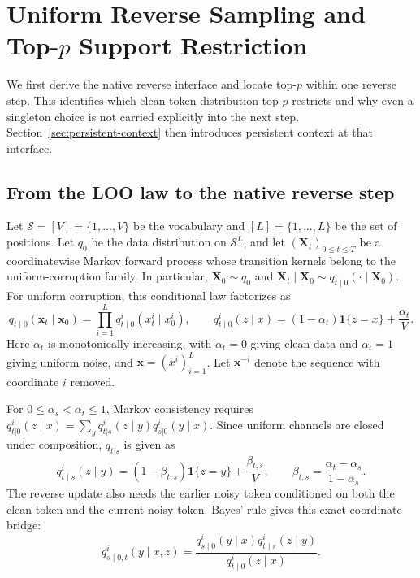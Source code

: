 \documentclass{article}
\newcommand{\1}{\mathbf 1}
\theoremstyle{definition}
\begin{document}
\section{Uniform Reverse Sampling and
\texorpdfstring{Top-$p$ Support Restriction}{Top-p Support Restriction}}
\label{sec:uniform-reverse}

We first derive the native reverse interface and locate top-$p$ within one
reverse step. This identifies which clean-token distribution top-$p$ restricts
and why even a singleton choice is not carried explicitly into the next
step. Section~\ref{sec:persistent-context} then introduces persistent context
at that interface.

\subsection{From the LOO law to the native reverse step}

Let $\mathcal S=[V]=\{1,\ldots,V\}$ be the vocabulary and
$[L]=\{1,\ldots,L\}$ be the set of positions. Let $q_0$ be the data distribution on
$\mathcal S^L$, and let $(\bm X_t)_{0\le t\le T}$ be a coordinatewise Markov forward process whose transition kernels belong to the uniform-corruption family. In particular,
$\bm X_0\sim q_0$ and
$\bm X_t\mid\bm X_0\sim q_{t\mid0}(\cdot\mid\bm X_0)$. For uniform
corruption, this conditional law factorizes as
\begin{equation}
 q_{t\mid0}(\bm x_t\mid\bm x_0)
 =\prod_{i=1}^Lq_{t\mid0}^i(x_t^i\mid x_0^i),
 \qquad
 q_{t\mid0}^i(z\mid x)
 =(1-\alpha_t)\1\{z=x\}+\frac{\alpha_t}{V}.
 \label{eq:uniform-forward-main}
\end{equation}
Here $\alpha_t$ is monotonically increasing,
with $\alpha_t=0$ giving clean data and $\alpha_t=1$ giving uniform noise,
and $\bm x=(x^i)_{i=1}^L$. Let $\bm x^{-i}$ denote the sequence with
coordinate $i$ removed.

For $0\le\alpha_s<\alpha_t\le1$, Markov consistency requires
$q_{t|0}^i(z\mid x) = \sum_y q_{t|s}^i(z\mid y)q_{s|0}^i(y\mid x)$.
Since uniform channels are closed under composition, $q_{t|s}$ is given as
\begin{equation}
 q_{t\mid s}^i(z\mid y)
 =(1-\beta_{t,s})\1\{z=y\}+\frac{\beta_{t,s}}{V},
 \qquad
 \beta_{t,s}=\frac{\alpha_t-\alpha_s}{1-\alpha_s}.
 \label{eq:intermediate-uniform-main}
\end{equation}
The reverse update also needs the earlier noisy token conditioned on both the
clean token and the current noisy token. %
Bayes' rule gives this exact coordinate bridge:
\begin{equation}
 q_{s\mid0,t}^i(y\mid x,z)
 =\frac{q_{s\mid0}^i(y\mid x)q_{t\mid s}^i(z\mid y)}
 {q_{t\mid0}^i(z\mid x)}.
 \label{eq:bridge-main}
\end{equation}
\end{document}
